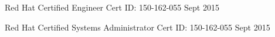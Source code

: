 

\begin{cvcerts}

  \cvcert
    {Red Hat Certified Engineer} %
    {Cert ID: 150-162-055} %
    {Sept 2015} %


  \cvcert
    {Red Hat Certified Systems Administrator} %
    {Cert ID: 150-162-055} %
    {Sept 2015} %


\end{cvcerts}

